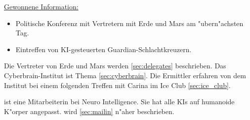 \begin{remarks}
	\underline{Gewonnene Information:}
	
	\begin{itemize}
		\item Politische Konferenz mit Vertretern mit Erde und Mars am "ubern"achsten Tag.
		\item Eintreffen von KI-gesteuerten Guardian-Schlachtkreuzern.
	\end{itemize}

	Die Vertreter von Erde und Mars werden \cref{sec:delegates} beschrieben. Das Cyberbrain-Institut ist Thema \cref{sec:cyberbrain}. Die Ermittler erfahren von dem Institut bei einem folgenden Treffen mit Carina im Ice Club \cref{sec:ice_club}.

	\ml{} ist eine Mitarbeiterin bei Neuro Intelligence. Sie hat alle KIs auf humanoide K"orper angepasst. \ml{} wird \cref{sec:mailin} n"aher beschrieben.
\end{remarks}

